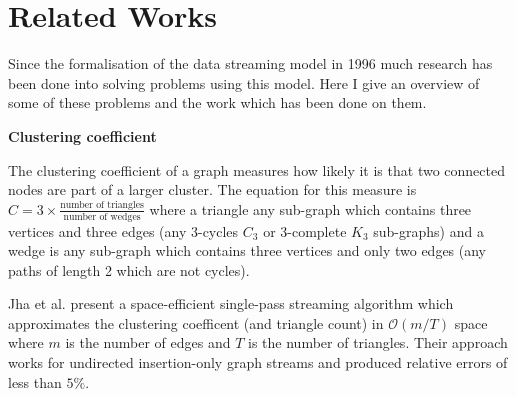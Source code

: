 \documentclass[11pt,twoside,a4paper]{report}
\begin{document}
\section{Related Works}



Since the formalisation of the data streaming model in 1996 much research has been done into solving problems using this model. Here I give an overview of some of these problems and the work which has been done on them.\newline

\par\noindent\textbf{Clustering coefficient}
\par The clustering coefficient of a graph measures how likely it is that two connected nodes are part of a larger cluster. The equation for this measure is $C=3\times\frac{\text{number of triangles}}{\text{number of wedges}}$ where a triangle any sub-graph which contains three vertices and three edges (\ie any 3-cycles $C_3$ or 3-complete $K_3$ sub-graphs) and a wedge is any sub-graph which contains three vertices and only two edges (\ie any paths of length 2 which are not cycles).
\par Jha et al. \cite{clusteringCofficient} present a space-efficient single-pass streaming algorithm which approximates the clustering coefficent (and triangle count) in $\mathcal{O}(m/T)$ space where $m$ is the number of edges and $T$ is the number of triangles. Their approach works for undirected insertion-only graph streams and produced relative errors of less than $5\%$.\newline
\end{document}
